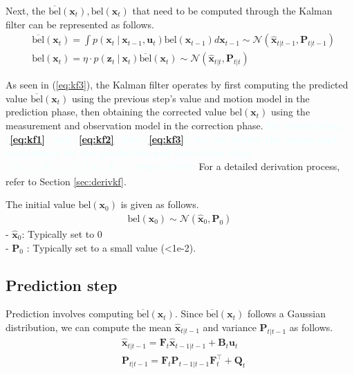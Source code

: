 \documentclass[10pt]{article}
\newcommand{\textbfazure}[1]{\textcolor{azure}{\textbf{#1}}}
\begin{document}
	Next, the $\overline{\text{bel}}(\mathbf{x}_{t}), \text{bel}(\mathbf{x}_{t})$ that need to be computed through the Kalman filter can be represented as follows.
	\begin{equation} \label{eq:kf3}
		\begin{aligned}
			& \overline{\text{bel}}(\mathbf{x}_{t}) = \int p(\mathbf{x}_{t} \ | \ \mathbf{x}_{t-1}, \mathbf{u}_{t})\text{bel}(\mathbf{x}_{t-1}) d \mathbf{x}_{t-1} \sim \mathcal{N}(\hat{\mathbf{x}}_{t|t-1}, \mathbf{P}_{t|t-1}) \\
			& \text{bel}(\mathbf{x}_{t}) = \eta \cdot p( \mathbf{z}_{t} \ | \  \mathbf{x}_{t})\overline{\text{bel}}(\mathbf{x}_{t}) \sim \mathcal{N}(\hat{\mathbf{x}}_{t|t}, \mathbf{P}_{t|t})
		\end{aligned}
	\end{equation}
	
	As seen in (\ref{eq:kf3}), the Kalman filter operates by first computing the predicted value $\overline{\text{bel}}(\mathbf{x}_{t})$ using the previous step's value and motion model in the prediction phase, then obtaining the corrected value $\text{bel}(\mathbf{x}_{t})$ using the measurement and observation model in the correction phase. \textbfazure{By substituting (\ref{eq:kf1}) and (\ref{eq:kf2}) into (\ref{eq:kf3}), we can derive the means and covariances for the prediction and correction steps $(\hat{\mathbf{x}}_{t|t-1}, \mathbf{P}_{t|t-1}), (\hat{\mathbf{x}}_{t|t}, \mathbf{P}_{t|t})$ respectively.} For a detailed derivation process, refer to Section \ref{sec:derivkf}.
	
	The initial value $\text{bel}(\mathbf{x}_{0})$ is given as follows.
	\begin{equation}
		\begin{aligned}
			\text{bel}(\mathbf{x}_{0}) \sim \mathcal{N}(\hat{\mathbf{x}}_{0}, \mathbf{P}_{0})
		\end{aligned}
	\end{equation}
	- $\hat{\mathbf{x}}_{0}$: Typically set to 0 \\
	- $\mathbf{P}_{0}$ : Typically set to a small value (<1e-2).
	
	\subsection{Prediction step}
	Prediction involves computing $\overline{\text{bel}}(\mathbf{x}_{t})$. Since $\overline{\text{bel}}(\mathbf{x}_{t})$ follows a Gaussian distribution, we can compute the mean $\hat{\mathbf{x}}_{t|t-1}$ and variance $\mathbf{P}_{t|t-1}$ as follows.
	\begin{equation}
		\boxed{ \begin{aligned}
				& \hat{\mathbf{x}}_{t|t-1} = \mathbf{F}_{t}\hat{\mathbf{x}}_{t-1|t-1} + \mathbf{B}_{t}\mathbf{u}_{t} \\
				& \mathbf{P}_{t|t-1} = \mathbf{F}_{t}\mathbf{P}_{t-1|t-1}\mathbf{F}_{t}^{\intercal} + \mathbf{Q}_{t}
		\end{aligned} }
	\end{equation}
	
\end{document}
